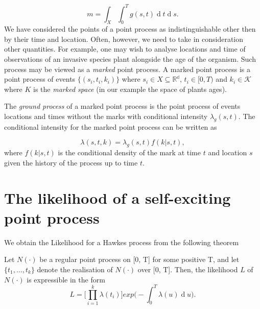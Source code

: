 \documentclass[11pt,a4paper]{article}
\renewcommand{\d}[1]{\ensuremath{\operatorname{d}\!{#1}}}
\begin{document}
\begin{equation}\label{eq:meanoffsp}
    m = \int_X \int_0^T g(s, t) \d t \d s.
\end{equation}
We have considered the points of a point process as indistinguishable other then by their time and location. Often, however, we need to take in consideration other quantities. For example, one may wish to analyse locations and time of observations of an invasive species plant alongside the age of the organism. Such process may be viewed as a \textit{marked} point process. A marked point process is a point process of events $\{ (s_i, t_i, k_i ) \}$ where  $s_i \in X \subseteq \mathbb{R^d}$, $t_i \in [0, T)$ and $k_i \in \mathcal{K}$ where $K$ is the \textit{marked space} (in our example the space of plants ages).

The \textit{ground process} of a marked point process is the point process of events locations and times without the marks with conditional intensity $\lambda_g(s, t)$. The conditional intensity for the marked point process can be written as

\begin{equation*}
    \lambda(s, t, k) = \lambda_g(s, t)f(k | s, t),
\end{equation*}
where $f(k | s, t)$ is the conditional density of the mark at time $t$ and location $s$ given the history of the process up to time $t$.








\section{The likelihood of a self-exciting point process}

We obtain the Likelihood for a Hawkes process from the following theorem

\begin{theorem}
    Let $N(\cdot)$ be a regular point process on [0, T] for some positive T, and let $\{ t_1, \dots, t_k \}$ denote the realisation of $N(\cdot)$ over [0, T]. Then, the likelihood $L$ of $N(\cdot)$ is expressible in the form
    \begin{equation*}
        L = \Bigg [ \prod_{i=1}^k \lambda(t_i) \Bigg] exp \Bigg( - \int_0^T \lambda(u) \d u \Bigg).
    \end{equation*}
\end{theorem}
\end{document}
